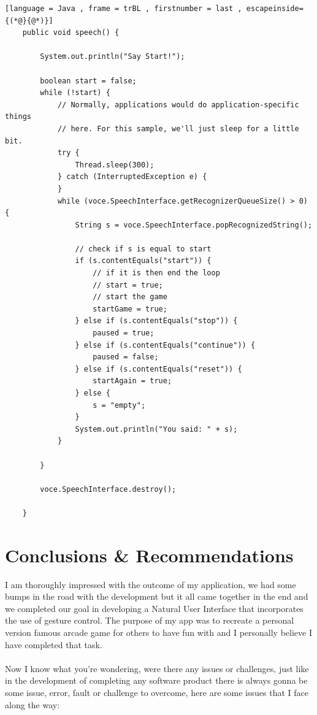 \documentclass{article}
\begin{document}
\begin{lstlisting}[language = Java , frame = trBL , firstnumber = last , escapeinside={(*@}{@*)}]
	public void speech() {

		System.out.println("Say Start!");

		boolean start = false;
		while (!start) {
			// Normally, applications would do application-specific things
			// here. For this sample, we'll just sleep for a little bit.
			try {
				Thread.sleep(300);
			} catch (InterruptedException e) {
			}
			while (voce.SpeechInterface.getRecognizerQueueSize() > 0) {
				String s = voce.SpeechInterface.popRecognizedString();

				// check if s is equal to start
				if (s.contentEquals("start")) {
					// if it is then end the loop
					// start = true;
					// start the game
					startGame = true;
				} else if (s.contentEquals("stop")) {
					paused = true;
				} else if (s.contentEquals("continue")) {
					paused = false;
				} else if (s.contentEquals("reset")) {
					startAgain = true;
				} else {
					s = "empty";
				}
				System.out.println("You said: " + s);
			}

		}

		voce.SpeechInterface.destroy();

	}
\end{lstlisting}

\section{Conclusions \& Recommendations}

I am thoroughly impressed with the outcome of my application, we had some bumps in the road with the development but it all came together in the end and we completed our goal in developing a Natural User Interface that incorporates the use of gesture control. The purpose of my app was to recreate a personal version famous arcade game for others to have fun with and I personally believe I have completed that task.\\ \\
Now I know what you're wondering, were there any issues or challenges, just like in the development of completing any software product there is always gonna be some issue, error, fault or challenge to overcome, here are some issues that I face along the way:
\end{document}
